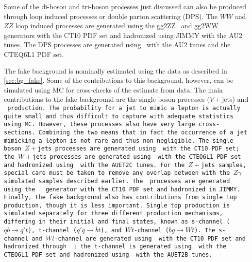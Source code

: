 Some of the di-boson and tri-boson processes just discussed can also be produced
through loop induced processes or double parton scattering (DPS).
The $WW$ and $ZZ$
loop induced processes are generated using the gg2ZZ~\cite{Binoth:2008pr} 
and gg2WW~\cite{Binoth:2006mf} generators with the CT10 PDF set and
hadronized using JIMMY with the AU2 tunes.
The DPS
processes are generated using \pythiaeight~with the AU2 
tunes and the CTEQ6L1 PDF set. 

The fake background is nominally estimated using the data
as described in \sec\ref{sec:bg_fake}. Some of the contributions
to this background, however, can be simulated using MC 
for cross-checks of 
the estimate from data. The main contributions
to the fake background
are the single boson processes ($V+$jets) and \tt~production.
The probability for a jet to mimic a lepton is actually quite small
and thus difficult to capture with adequate statistics using MC. 
However, these processes also have very large cross-sections.
Combining the two means that in fact the occurrence of a jet mimicking
a lepton is not rare and thus non-negligible. 
The single boson $Z+$jets processes are generated using \sherpa~with the CT10
PDF set; the $W+$jets processes are generated using \alpgen~with
the CTEQ6L1 PDF set and hadronized using \jimmy~with the AUET2C tunes.
For the $Z+$jets samples, special care must be taken to remove any overlap 
between with the $Z\gamma$ simulated samples described earlier.
The \tt~processes are generated using the \mcatnlo~\cite{MCatNLO}
generator with the CT10 PDF set and hadronized in JIMMY.  %
Finally, the fake background also has contributions from single top production,
though it is less important. Single top production is simulated separately 
for three different production mechanisms, differing in their initial
and final states, known as
s-channel ($qb\to q't$), t-channel ($q'\overline{q}\to \overline{b}t$), 
and $Wt$-channel ($bg \to Wt$). The s-channel 
and $Wt$-channel are generated using \mcatnlo~with the CT10 PDF set and 
hadronized through \jimmy~; the t-channel is generated using 
\madgraph~with the CTEQ6L1 PDF set and hadronized 
using \pythiasix~with the AUET2B tunes.

